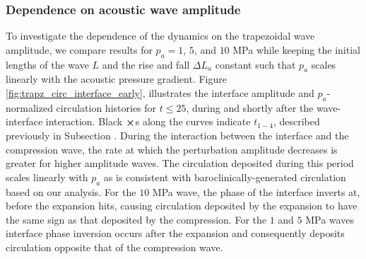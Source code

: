 \subsubsection{Dependence on acoustic wave amplitude}%
\label{subsubsec:usbe_lung_amplitude_dependence}%
To investigate the dependence of the dynamics on the trapezoidal wave
amplitude, we compare results for $p_a=1$, $5$, and $10$ MPa while
keeping the initial lengths of the wave $L$ and the rise and fall
$\Delta L_a$ constant such that $p_a$ scales linearly with the
acoustic pressure gradient. Figure
\ref{fig:trapz_circ_interface_early}, illustrates the interface
amplitude and $p_a$-normalized circulation histories for $t\leq25$,
during and shortly after the wave-interface interaction. Black
$\boldsymbol{\times}$s along the curves indicate $t_{1-4}$, described
previously in Subsection \label{subsec:Qualitative}. During the
interaction between the interface and the compression wave, the rate
at which the perturbation amplitude decreases is greater for higher
amplitude waves. The circulation deposited during this period scales
linearly with $p_a$ as is consistent with baroclinically-generated
circulation based on our analysis. For the $10$ MPa wave, the phase of
the interface inverts at, before the expansion hits, causing
circulation deposited by the expansion to have the same sign as that
deposited by the compression. For the $1$ and $5$ MPa waves interface
phase inversion occurs after the expansion and consequently deposits
circulation opposite that of the compression wave.

